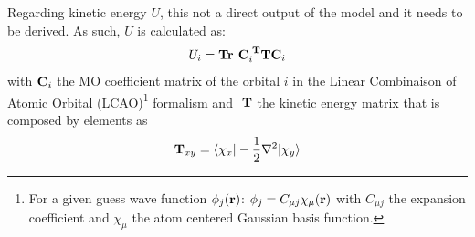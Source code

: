 \documentclass[article,preview]{planetary}
\begin{document}
 Regarding kinetic energy $U$, this not a direct output of the model and it needs to be derived. As such, $U$ is calculated as:
\begin{align}
   U_i = \textrm{\bfseries Tr } \textrm{\bfseries C}_i^\textrm{ \bfseries T} \textrm{\bfseries T} \textrm{\bfseries C}_i
\end{align}
with $\textrm{\bfseries C}_i$ the MO coefficient matrix of the orbital $i$ in the Linear Combinaison of Atomic Orbital (LCAO)\footnote{For a given guess wave function $\phi_j(\textrm{\bfseries r})$: $\phi_j = C_{\mu j}\chi_\mu(\textrm{\bfseries r})$ with $C_{\mu j}$ the expansion coefficient and $\chi_\mu$ the atom centered Gaussian basis function.} formalism and $\textrm{ \bfseries T}$ the kinetic energy matrix that is composed by elements as
 \begin{align}
\textrm{\bfseries T}_{xy} = \langle \chi_x | -\frac{1}{2}\nabla^2 | \chi_y \rangle
\end{align}

\end{document}
